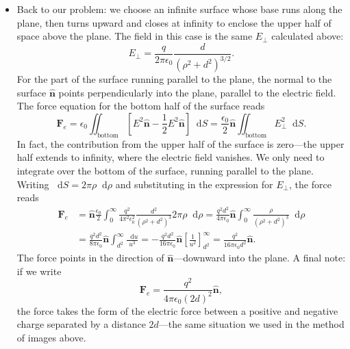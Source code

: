\documentclass[11pt, a4paper]{article}
\newcommand{\diff}{\mathop{}\!\mathrm{d}} %
\renewcommand{\vec}[1]{\bm{#1}} %
\newcommand{\uvec}[1]{\hat{\vec{#1}}} %
\newcommand{\ee}{\epsilon_{0}}  %
\begin{document}
\begin{itemize}
	\item Back to our problem: we choose an infinite surface whose base runs along the plane, then turns upward and closes at infinity to enclose the upper half of space above the plane. The field in this case is the same $ E_{\perp} $ calculated above:
	\begin{equation*}
		E_{\perp} = \frac{q}{2\pi \ee}\frac{d}{(\rho^{2}+d^{2})^{3/2}}.
	\end{equation*}
	For the part of the surface running parallel to the plane, the normal to the surface $ \uvec{n} $ points perpendicularly into the plane, parallel to the electric field. The force equation for the bottom half of the surface reads 
	\begin{equation*}
		\vec{F}_{e} = \ee \iint_{\text{bottom}} \left[E^{2}\uvec{n}- \frac{1}{2}E^{2}\uvec{n}\right]\diff S = \frac{\ee}{2}\uvec{n}\iint_{\text{bottom}} E_{\perp}^{2}\diff S.
	\end{equation*}
	In fact, the contribution from the upper half of the surface is zero---the upper half extends to infinity, where the electric field vanishes. We only need to integrate over the bottom of the surface, running parallel to the plane. Writing $ \diff S = 2\pi \rho \diff \rho $ and substituting in the expression for $ E_{\perp} $, the force reads
	\begin{align*}
		\vec{F}_{e} &= \uvec{n}\frac{\ee}{2}\int_{0}^{\infty} \frac{q^{2}}{4\pi^{2}\ee^{2}}\frac{d^{2}}{(\rho^{2} + d^{2})^{3}} 2\pi \rho \diff \rho = \frac{q^{2}d^{2}}{4\pi \ee}\uvec{n}\int_{0}^{\infty}\frac{\rho}{(\rho^{2} + d^{2})^{3}} \diff \rho\\
		&=  \frac{q^{2}d^{2}}{8\pi \ee}\uvec{n}\int_{d^{2}}^{\infty}\frac{\diff u}{u^{3}} = - \frac{q^{2}d^{2}}{16\pi \ee}\uvec{n} \left[\frac{1}{u^{2}}\right]_{d^{2}}^{\infty} = \frac{q^{2}}{16\pi \ee d^{2}}\uvec{n}.
	\end{align*}
	The force points in the direction of $ \uvec{n} $---downward into the plane. A final note: if we write
	\begin{equation*}
		\vec{F}_{e} = \frac{q^{2}}{4\pi \ee (2d)^{2}}\uvec{n},
	\end{equation*}
	the force takes the form of the electric force between a positive and negative charge separated by a distance $ 2d $---the same situation we used in the method of images above. 
	
\end{itemize}

\newpage
\end{document}
